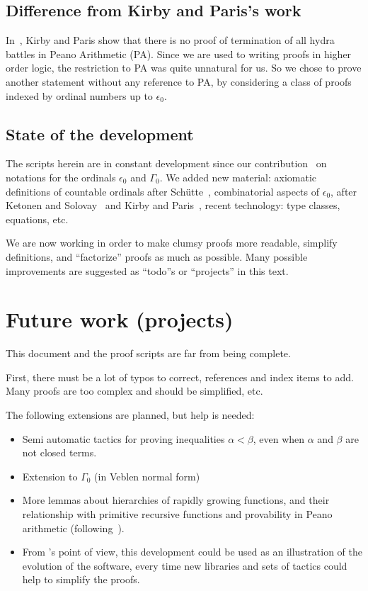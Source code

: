 
\subsection*{Difference from Kirby and Paris's work}
In~\cite{KP82}, Kirby and Paris show  that there is no proof of termination of all hydra battles in Peano Arithmetic (PA).
Since we are used to writing proofs in higher order logic, the restriction to PA was quite unnatural for us. So we chose to prove another statement without any reference to PA, by considering a class of proofs indexed by ordinal numbers up to $\epsilon_0$.

\subsection*{State of the development}
The \coq{} scripts herein are in constant development since our contribution~\cite{CantorContrib} on  notations for the ordinals $\epsilon_0$ and $\Gamma_0$.
We added new material: axiomatic definitions of countable ordinals after Schütte~\cite{schutte}, combinatorial aspects of $\epsilon_0$, after Ketonen and Solovay~\cite{KS81} and Kirby and Paris~\cite{KP82}, recent \coq{} technology: type classes, equations, etc.

We are now working in order to make clumsy proofs more readable, simplify definitions, and ``factorize'' proofs as much as possible. 
Many possible improvements are suggested as ``todo''s or ``projects'' in this text.


\section*{Future work (projects)}

This document and the proof scripts are far from being complete.

First, there must be a lot of typos to correct, references and index items to add. Many proofs are too complex and should be simplified, etc.

The following extensions are planned, but help is needed:

\begin{itemize}
\item Semi automatic tactics for proving inequalities $\alpha < \beta$, even when $\alpha$ and $\beta$ are not closed terms.
\item Extension to $\Gamma_0$ (in Veblen normal form)
\item More lemmas about hierarchies of rapidly growing functions, and their relationship 
    with primitive recursive functions and provability in Peano arithmetic 
(following~\cite{KS81, KP82}).
\item From \coq's point of view, this development could be used as an illustration of the evolution of the software, every time new libraries and sets of tactics could help to simplify the proofs.
\end{itemize}

